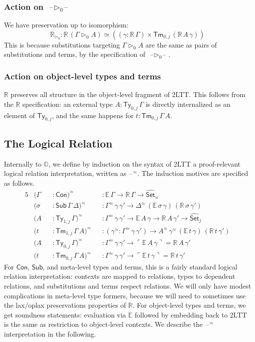 \documentclass[acmsmall]{acmart}
\newcommand{\msf}[1]{\mathsf{#1}}
\newcommand{\mbb}[1]{\mathbb{#1}}
\newcommand{\wh}[1]{\widehat{#1}}
\newcommand{\ext}{\triangleright}
\newcommand{\mbbo}{\mbb{O}}
\newcommand{\Con}{\msf{Con}}
\newcommand{\Sub}{\msf{Sub}}
\newcommand{\Ty}{\msf{Ty}}
\newcommand{\Tm}{\msf{Tm}}
\newcommand{\Set}{\mathsf{Set}}
\newcommand{\blank}{{\mathord{\hspace{1pt}\text{--}\hspace{1pt}}}}
\newcommand{\emb}[1]{\ulcorner#1\urcorner}
\newcommand{\hato}{\bm\hat{\mbbo}}
\newcommand{\ev}{\mbb{E}}
\newcommand{\re}{\mbb{R}}
\theoremstyle{remark}
\newcommand{\whset}{\wh{\Set}}
\newcommand{\rel}{^{\approx}}
\begin{document}
\subsubsection{Action on $\blank\ext_0\blank$} We have preservation up to isomorphism:
\[
  \re_{\ext_0} : \re\,(\Gamma \ext_0 A) \simeq ((\gamma : \re\,\Gamma)\times \Tm_{0,j}\,(\re\,A\,\gamma))
\]
This is because substitutions targeting $\Gamma \ext_0 A$ are the same as
pairs of substitutions and terms, by the specification of $\blank\ext_0\blank$.

\subsubsection{Action on object-level types and terms} $\re$ preserves all structure
in the object-level fragment of 2LTT. This follows from the $\re$ specification:
an external type $A : \Ty_{0,j}\,\Gamma$ is directly internalized as an element
of $\Ty_{0,j}$, and the same happens for $t : \Tm_{0,j}\,\Gamma\,A$.


\subsection{The Logical Relation}

Internally to $\hato$, we define by induction on the syntax of 2LTT a
proof-relevant logical relation interpretation, written as $\blank^{\approx}$. The induction
motives are specified as follows.
\begin{alignat*}{5}
  &(\Gamma &&: \Con)\rel && : \ev\,\Gamma \to \re\,\Gamma \to \whset_\omega\\
  &(\sigma &&: \Sub\,\Gamma\,\Delta)\rel &&: \Gamma\rel\,\gamma\,\gamma' \to \Delta\rel\,(\ev\,\sigma\,\gamma)\,(\re\,\sigma\,\gamma')\\
  &(A      &&: \Ty_{1,j}\,\Gamma)\rel &&: \Gamma\rel\,\gamma\,\gamma' \to \ev\,A\,\gamma \to \re\,A\,\gamma' \to \whset_j\\
  &(t      &&: \Tm_{1,j}\,\Gamma\,A)\rel &&: (\gamma\rel : \Gamma\rel\,\gamma\,\gamma') \to A\rel\,\gamma\rel\,(\ev\,t\,\gamma)\,(\re\,t\,\gamma')\\
  &(A      &&: \Ty_{0,j}\,\Gamma)\rel &&: \Gamma\rel\,\gamma\,\gamma' \to \emb{\ev\,A\,\gamma} = \re\,A\,\gamma' \\
  &(t      &&: \Tm_{0,j}\,\Gamma\,A)\rel &&: \Gamma\rel\,\gamma\,\gamma' \to \emb{\ev\,t\,\gamma} = \re\,t\,\gamma'
\end{alignat*}
For $\Con$, $\Sub$, and meta-level types and terms, this is a fairly standard
logical relation interpretation: contexts are mapped to relations, types to
dependent relations, and substitutions and terms respect relations. We will only have
modest complications in meta-level type formers, because we will need to sometimes use
the lax/oplax preservations properties of $\re$. For object-level types and
terms, we get soundness statements: evaluation via $\ev$ followed by embedding
back to 2LTT is the same as restriction to object-level contexts. We describe
the $\blank\rel$ interpretation in the following.
\end{document}
